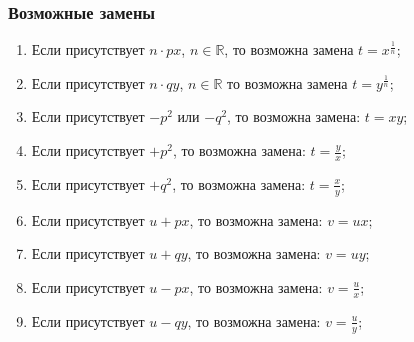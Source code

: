 		\subsubsection*{Возможные замены}
			\begin{enumerate}
				\item Если присутствует $n \cdot px$, $n \in \mathbb{R}$, то возможна замена \( t = x^{\frac{1}{n}} \);
				\item Если присутствует $n \cdot qy$, $n \in \mathbb{R}$ то возможна замена \( t = y^{\frac{1}{n}} \);
				\item Если присутствует $- p^2$ или $- q^2$, то возможна замена: \( t = xy \);
				\item Если присутствует $+ p^2$, то возможна замена: \( t = \frac{y}{x} \);
				\item Если присутствует $+ q^2$, то возможна замена: \( t = \frac{x}{y} \);
				\item Если присутствует $u + px$, то возможна замена: \( v = ux \);
				\item Если присутствует $u + qy$, то возможна замена: \( v = uy \);
				\item Если присутствует $u - px$, то возможна замена: \( v = \frac{u}{x} \);
				\item Если присутствует $u - qy$, то возможна замена: \( v = \frac{u}{y} \);
			\end{enumerate}

	\pagebreak
